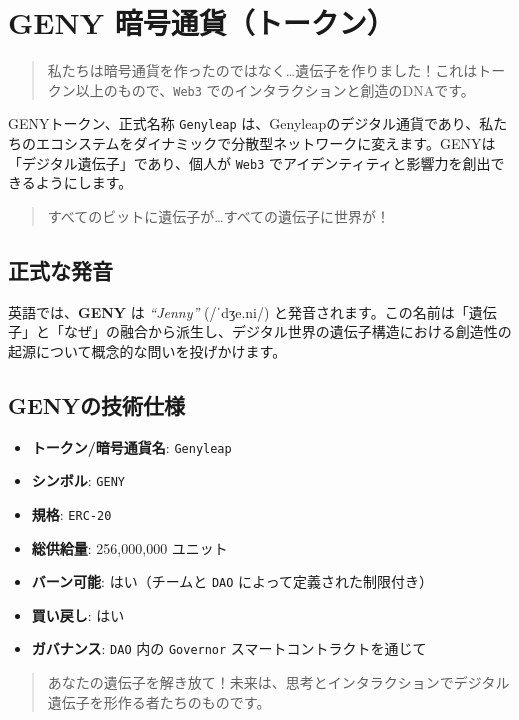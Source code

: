 \documentclass[a4paper,12pt,openany]{book}
\begin{document}
\chapter{GENY 暗号通貨（トークン）}
\begin{quote}
私たちは暗号通貨を作ったのではなく…遺伝子を作りました！これはトークン以上のもので、\texttt{Web3} でのインタラクションと創造のDNAです。
\end{quote}
GENYトークン、正式名称 \texttt{Genyleap} は、Genyleapのデジタル通貨であり、私たちのエコシステムをダイナミックで分散型ネットワークに変えます。GENYは「デジタル遺伝子」であり、個人が \texttt{Web3} でアイデンティティと影響力を創出できるようにします。
\begin{quote}
すべてのビットに遺伝子が…すべての遺伝子に世界が！
\end{quote}

\section*{正式な発音}
英語では、\textbf{GENY} は \textit{``Jenny''} ({\ipafont /ˈdʒe.ni/}) と発音されます。この名前は「遺伝子」と「なぜ」の融合から派生し、デジタル世界の遺伝子構造における創造性の起源について概念的な問いを投げかけます。

\section*{GENYの技術仕様}
\begin{itemize}
    \item \textbf{トークン/暗号通貨名}: \texttt{Genyleap}
    \item \textbf{シンボル}: \texttt{GENY}
    \item \textbf{規格}: \texttt{ERC-20}
    \item \textbf{総供給量}: 256,000,000 ユニット
    \item \textbf{バーン可能}: はい（チームと \texttt{DAO} によって定義された制限付き）
    \item \textbf{買い戻し}: はい
    \item \textbf{ガバナンス}: \texttt{DAO} 内の \texttt{Governor} スマートコントラクトを通じて
\end{itemize}
\vspace{-0.5em}
\begin{quote}
あなたの遺伝子を解き放て！未来は、思考とインタラクションでデジタル遺伝子を形作る者たちのものです。
\end{quote}
\newpage
\end{document}
